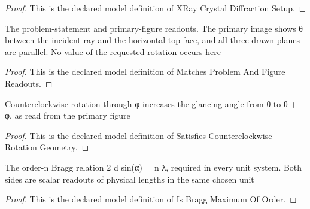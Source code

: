 \begin{proof}
  This is the declared model definition of XRay Crystal Diffraction Setup.
\end{proof}
\begin{definition}
  \label{def:physics:phyx-mini-0079:phyxminiproblems-problemphyxmini0079-matchesproblemandfigurereadouts}
  The problem-statement and primary-figure readouts. The primary image shows θ between the incident ray and the horizontal top face, and all three drawn planes are parallel. No value of the requested rotation occurs here
\end{definition}
\begin{proof}
  This is the declared model definition of Matches Problem And Figure Readouts.
\end{proof}
\begin{definition}
  \label{def:physics:phyx-mini-0079:phyxminiproblems-problemphyxmini0079-satisfiescounterclockwiserotationgeometry}
  Counterclockwise rotation through φ increases the glancing angle from θ to θ + φ, as read from the primary figure
\end{definition}
\begin{proof}
  This is the declared model definition of Satisfies Counterclockwise Rotation Geometry.
\end{proof}
\begin{definition}
  \label{def:physics:phyx-mini-0079:phyxminiproblems-problemphyxmini0079-isbraggmaximumoforder}
  The order-n Bragg relation 2 d sin(α) = n λ, required in every unit system. Both sides are scalar readouts of physical lengths in the same chosen unit
\end{definition}
\begin{proof}
  This is the declared model definition of Is Bragg Maximum Of Order.
\end{proof}
